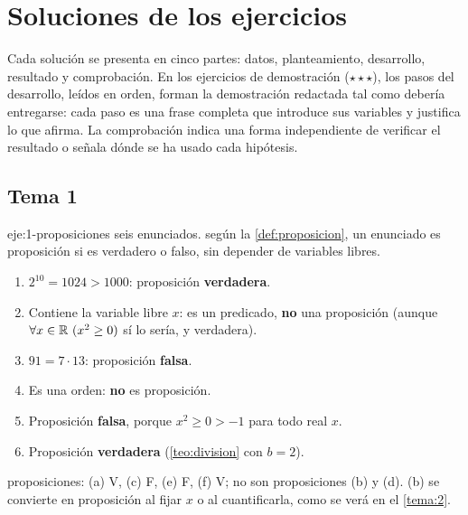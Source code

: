 \chapter{Soluciones de los ejercicios}
\label{ap:soluciones}

Cada solución se presenta en cinco partes: datos, planteamiento, desarrollo, resultado y comprobación. En los ejercicios de demostración ($\star\star\star$), los pasos del desarrollo, leídos en orden, forman la demostración redactada tal como debería entregarse: cada paso es una frase completa que introduce sus variables y justifica lo que afirma. La comprobación indica una forma independiente de verificar el resultado o señala dónde se ha usado cada hipótesis.

\section{Tema 1}

\begin{solucion}{eje:1-proposiciones}
\datos seis enunciados.
\planteamiento según la \cref{def:proposicion}, un enunciado es proposición si es verdadero o falso, sin depender de variables libres.
\pasos
\begin{enumerate}[label=(\alph*)]
  \item $2^{10}=1024>1000$: proposición \textbf{verdadera}.
  \item Contiene la variable libre $x$: es un predicado, \textbf{no} una proposición (aunque $\forall x\in\mathbb{R}\ (x^{2}\ge 0)$ sí lo sería, y verdadera).
  \item $91=7\cdot 13$: proposición \textbf{falsa}.
  \item Es una orden: \textbf{no} es proposición.
  \item Proposición \textbf{falsa}, porque $x^{2}\ge 0>-1$ para todo real $x$.
  \item Proposición \textbf{verdadera} (\cref{teo:division} con $b=2$).
\end{enumerate}
\resultado proposiciones: (a) V, (c) F, (e) F, (f) V; no son proposiciones (b) y (d).
\comprobacion (b) se convierte en proposición al fijar $x$ o al cuantificarla, como se verá en el \cref{tema:2}.
\end{solucion}

